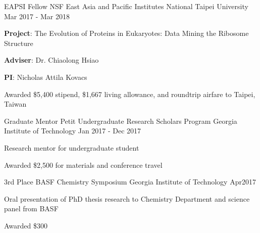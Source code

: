 

\begin{cventries}

  \cventry
    {EAPSI Fellow} %
    {NSF East Asia and Pacific Institutes} %
    {National Taipei University} %
    {Mar 2017 - Mar 2018} %
    {
      \begin{cvitems} %
        \item {{\bf Project}: The Evolution of Proteins in Eukaryotes: Data Mining the Ribosome Structure}
        \item {{\bf Adviser}: Dr. Chiaolong Hsiao}
        \item {{\bf PI}: Nicholas Attila Kovacs}
        \item {Awarded \$5,400 stipend, \$1,667 living allowance, and roundtrip airfare to Taipei, Taiwan}
      \end{cvitems}
    }

  \cventry
    {Graduate Mentor} %
    {Petit Undergraduate Research Scholars Program} %
    {Georgia Institute of Technology} %
    {Jan 2017 - Dec 2017} %
    {
      \begin{cvitems} %
        \item {Research mentor for undergraduate student}
        \item {Awarded \$2,500 for materials and conference travel}
      \end{cvitems}
    }

  \cventry
    {3rd Place} %
    {BASF Chemistry Symposium} %
    {Georgia Institute of Technology} %
    {Apr2017} %
    {
      \begin{cvitems} %
      	\item {Oral presentation of PhD thesis research to Chemistry Department and science panel from BASF}
        \item {Awarded \$300}
      \end{cvitems}
    }
\vspace{-4.5mm}


\end{cventries}
